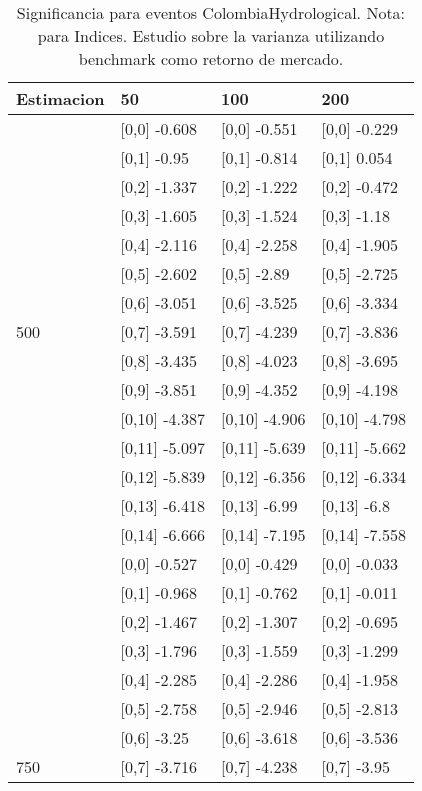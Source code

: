 \begin{table}

\caption{Significancia para eventos ColombiaHydrological. Nota: para Indices. Estudio sobre la varianza utilizando benchmark como retorno de mercado.}
\centering
\begin{tabular}[t]{llll}
\toprule
Estimacion & 50 & 100 & 200\\
\midrule
 & {}[0,0] -0.608 & {}[0,0] -0.551 & {}[0,0] -0.229\\
 & {}[0,1] -0.95 & {}[0,1] -0.814 & {}[0,1] 0.054\\
 & {}[0,2] -1.337 & {}[0,2] -1.222 & {}[0,2] -0.472\\
 & {}[0,3] -1.605 & {}[0,3] -1.524 & {}[0,3] -1.18\\
 & {}[0,4] -2.116 & {}[0,4] -2.258 & {}[0,4] -1.905\\
\addlinespace
 & {}[0,5] -2.602 & {}[0,5] -2.89 & {}[0,5] -2.725\\
 & {}[0,6] -3.051 & {}[0,6] -3.525 & {}[0,6] -3.334\\
500 & {}[0,7] -3.591 & {}[0,7] -4.239 & {}[0,7] -3.836\\
 & {}[0,8] -3.435 & {}[0,8] -4.023 & {}[0,8] -3.695\\
 & {}[0,9] -3.851 & {}[0,9] -4.352 & {}[0,9] -4.198\\
\addlinespace
 & {}[0,10] -4.387 & {}[0,10] -4.906 & {}[0,10] -4.798\\
 & {}[0,11] -5.097 & {}[0,11] -5.639 & {}[0,11] -5.662\\
 & {}[0,12] -5.839 & {}[0,12] -6.356 & {}[0,12] -6.334\\
 & {}[0,13] -6.418 & {}[0,13] -6.99 & {}[0,13] -6.8\\
 & {}[0,14] -6.666 & {}[0,14] -7.195 & {}[0,14] -7.558\\
\addlinespace
 & {}[0,0] -0.527 & {}[0,0] -0.429 & {}[0,0] -0.033\\
 & {}[0,1] -0.968 & {}[0,1] -0.762 & {}[0,1] -0.011\\
 & {}[0,2] -1.467 & {}[0,2] -1.307 & {}[0,2] -0.695\\
 & {}[0,3] -1.796 & {}[0,3] -1.559 & {}[0,3] -1.299\\
 & {}[0,4] -2.285 & {}[0,4] -2.286 & {}[0,4] -1.958\\
\addlinespace
 & {}[0,5] -2.758 & {}[0,5] -2.946 & {}[0,5] -2.813\\
 & {}[0,6] -3.25 & {}[0,6] -3.618 & {}[0,6] -3.536\\
750 & {}[0,7] -3.716 & {}[0,7] -4.238 & {}[0,7] -3.95\\

\end{tabular}
\end{table}
